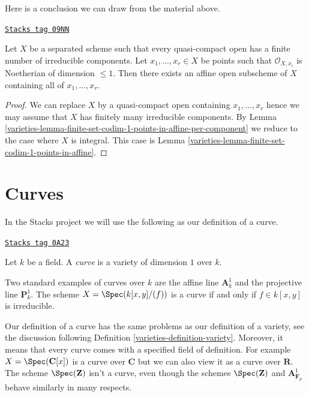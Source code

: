 Here is a conclusion we can draw from the material above.

\begin{proposition}
\label{varieties-proposition-finite-set-of-points-of-codim-1-in-affine}
\href{https://stacks.math.columbia.edu/tag/09NN}{\texttt{Stacks tag 09NN}}

Let $X$ be a separated scheme such that every quasi-compact open
has a finite number of irreducible components. Let $x_1, \ldots, x_r \in X$
be points such that $\mathcal{O}_{X, x_i}$ is Noetherian
of dimension $\leq 1$. Then there exists an affine open subscheme
of $X$ containing all of $x_1, \ldots, x_r$.
\end{proposition}

\begin{proof}

We can replace $X$ by a quasi-compact open containing $x_1, \ldots, x_r$
hence we may assume that $X$ has finitely many irreducible components.
By Lemma \ref{varieties-lemma-finite-set-codim-1-points-in-affine-per-component}
we reduce to the case where $X$ is integral. This case is
Lemma \ref{varieties-lemma-finite-set-codim-1-points-in-affine}.
\end{proof}

\section{Curves}
\label{varieties-section-curves}
In the Stacks project we will use the following as our definition
of a curve.

\begin{definition}[Curve]
\label{varieties-definition-curve}
\href{https://stacks.math.columbia.edu/tag/0A23}{\texttt{Stacks tag 0A23}}

Let $k$ be a field. A {\it curve} is a variety of dimension $1$ over $k$.
\end{definition}

Two standard examples of curves over $k$ are the affine line $\mathbf{A}^1_k$
and the projective line $\mathbf{P}^1_k$. The scheme $X = \Spec(k[x, y]/(f))$
is a curve if and only if $f \in k[x, y]$ is irreducible.

\medskip\noindent
Our definition of a curve has the same problems as our definition of a
variety, see the discussion following Definition \ref{varieties-definition-variety}.
Moreover, it means that every curve comes with a specified field of definition.
For example $X = \Spec(\mathbf{C}[x])$ is a curve over $\mathbf{C}$
but we can also view it as a curve over $\mathbf{R}$. The scheme
$\Spec(\mathbf{Z})$ isn't a curve, even though the schemes $\Spec(\mathbf{Z})$
and $\mathbf{A}^1_{\mathbf{F}_p}$ behave similarly in many respects.


